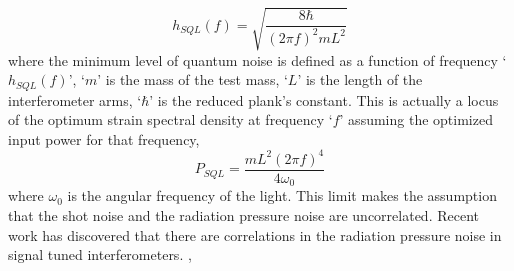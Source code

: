 \begin{equation}
    h_{SQL}(f) = \sqrt{\frac{8\hbar}{(2\pi f)^2 mL^2}} 
\end{equation}
where the minimum level of quantum noise is defined as a function of frequency `$h_{SQL}(f)$', `$m$' is  the mass of the test mass, `$L$' is the length of the interferometer arms, `$\hbar$' is the reduced plank's constant. This is actually a locus of the optimum strain spectral density at frequency `$f$' assuming the optimized input power for that frequency,
\begin{equation}
    P_{SQL} = \frac{mL^2(2\pi f)^4}{4\omega_0}
\end{equation}
where $\omega_0$ is the angular frequency of the light. This limit makes the assumption that the shot noise and the radiation pressure noise are uncorrelated. Recent work has discovered that there are correlations in the radiation pressure noise in signal tuned interferometers. \cite{buonanno18optical},\cite{buonanno2001quantum}

\pagebreak















































































\pagebreak
